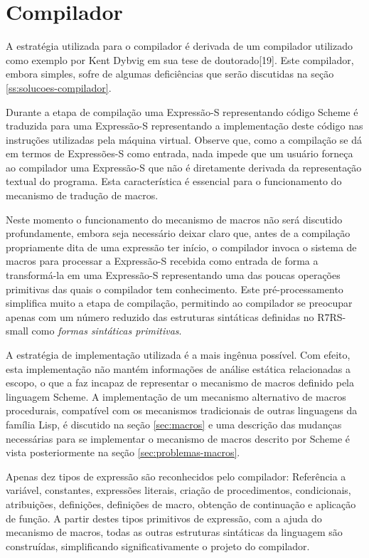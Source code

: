 \section{Compilador}
\label{sec:compilador}

A estratégia utilizada para o compilador é derivada de um compilador utilizado
como exemplo por Kent Dybvig em sua tese de doutorado[19]. Este compilador,
embora simples, sofre de algumas deficiências que serão discutidas na seção
\ref{ss:solucoes-compilador}.

Durante a etapa de compilação uma Expressão-S representando código
Scheme é traduzida para uma Expressão-S representando a implementação deste
 código nas
instruções utilizadas pela máquina virtual. Observe que, como a compilação se
dá em termos de Expressões-S como entrada, nada impede que um usuário forneça
ao compilador uma Expressão-S que não é diretamente derivada da representação
textual do programa. Esta característica é essencial para o funcionamento do
mecanismo de tradução de macros.

Neste momento o funcionamento do mecanismo de macros não será discutido
profundamente, embora seja necessário deixar claro que, antes de a compilação
propriamente dita de uma expressão ter início, o compilador invoca o sistema de
macros para processar a Expressão-S recebida como entrada de forma a
transformá-la em uma Expressão-S representando uma das poucas operações
primitivas das quais o compilador tem conhecimento. Este pré-processamento
simplifica muito a etapa de compilação, permitindo ao compilador se preocupar
apenas com um número reduzido das estruturas sintáticas definidas no R7RS-small
como \textit{formas sintáticas primitivas}.

A estratégia de implementação utilizada é a mais ingênua possível. Com efeito,
esta implementação não mantém informações de análise estática relacionadas a
escopo, o que a faz incapaz de representar o mecanismo de macros definido pela
linguagem Scheme. A implementação de um mecanismo alternativo de macros
procedurais, compatível com os mecanismos tradicionais de outras linguagens da
família Lisp, é discutido na seção \ref{sec:macros} e uma descrição das
mudanças necessárias para se implementar o mecanismo de macros descrito por
Scheme é vista posteriormente na seção \ref{sec:problemas-macros}.

Apenas dez tipos de expressão são reconhecidos pelo compilador: Referência a variável,
constantes,  expressões literais, criação de procedimentos, condicionais,
atribuições, definições, definições de macro, obtenção de continuação e
aplicação de função. A partir destes tipos primitivos de expressão, com a ajuda
do mecanismo de macros, todas as outras estruturas sintáticas da linguagem são
construídas, simplificando significativamente o projeto do compilador.

